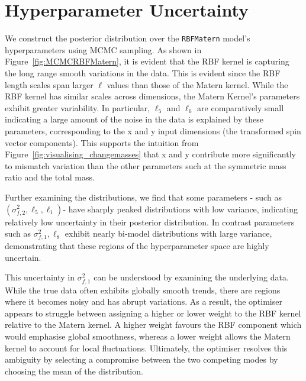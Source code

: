 \documentclass{ucdgradtaughtthesis}
\begin{document}
\section{Hyperparameter Uncertainty}
We construct the posterior distribution over the \texttt{RBFMatern} model's hyperparameters using MCMC sampling. As shown in Figure~\ref{fig:MCMCRBFMatern}, 
it is evident that the RBF kernel is capturing the long range smooth variations in the data. This is evident since the RBF length scales span larger \(\ell\) values than those of the Matern kernel.
While the RBF kernel has similar scales across dimensions, the Matern Kernel's parameters exhibit greater variability.
In particular, \(\ell_5\) and \(\ell_6\) are comparatively small indicating a large amount of the noise in the data is explained by these parameters, corresponding to the x and y input dimensions (the transformed spin vector components).
This supports the intuition from Figure~\ref{fig:visualising_changemasses} that x and y contribute more significantly to mismatch variation than the other parameters such at the symmetric mass ratio and the total mass. 
%

Further examining the distributions, we find that some parameters - such as \((\sigma_{f,2}^2, \ell_5,\ell_1)\)- have sharply peaked distributions with low variance, indicating relatively low uncertainty in their posterior distribution. 
In contrast parameters such as \(\sigma_{f,1}^2 , \ell_8\) exhibit nearly bi-model distributions with large variance, demonstrating that these regions of the hyperparameter space are highly uncertain.
%

This uncertainty in \(\sigma_{f,1}^2\) can be understood by examining the underlying data. While the true data often exhibits globally smooth trends, there are regions where it becomes noisy and has abrupt variations. As a result, 
the optimiser appears to struggle between assigning a higher or lower weight to the RBF kernel relative to the Matern kernel. 
A higher weight favours the RBF component which would emphasise global smoothness, whereas a lower weight allows the Matern kernel to account for local fluctuations. 
Ultimately, the optimiser resolves this ambiguity by selecting a compromise between the two competing modes by choosing the 
mean of the distribution.
\end{document}
